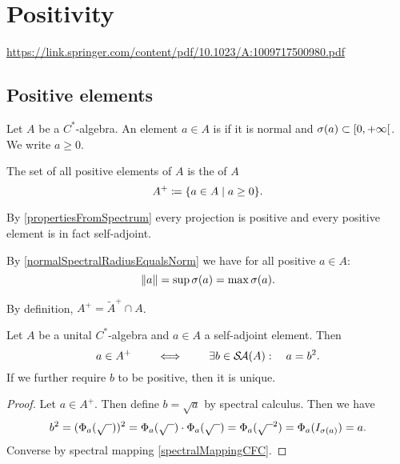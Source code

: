 \section{Positivity}
\url{https://link.springer.com/content/pdf/10.1023/A:1009717500980.pdf}
\subsection{Positive elements}
\begin{definition}
Let $A$ be a $C^*$-algebra. An element $a\in A$ is  if it is normal and $\sigma(a) \subset \interval[co]{0,+\infty}$. We write $a\geq 0$.

The set of all positive elements of $A$ is the  of $A$
\[ A^+ \defeq \setbuilder{a\in A}{a\geq 0}. \]
\end{definition}
By \ref{propertiesFromSpectrum} every projection is positive and every positive element is in fact self-adjoint.

By \ref{normalSpectralRadiusEqualsNorm} we have for all positive $a\in A$:
\[ \lVert a\rVert = \sup\sigma(a) = \max\sigma(a). \]

By definition, $A^+ = \widetilde{A}^+ \cap A$.

\begin{proposition}
Let $A$ be a unital $C^*$-algebra and $a\in A$ a self-adjoint element. Then
\[ a\in A^+ \qquad\iff\qquad \exists b\in \mathop{\mathcal{S}\hspace{-0.15em}\mathcal{A}}\nolimits(A):\quad a = b^2. \]
If we further require $b$ to be positive, then it is unique.
\end{proposition}
\begin{proof}
Let $a\in A^+$. Then define $b = \sqrt{a}$ by spectral calculus. Then we have
\[ b^2 = (\Phi_a(\sqrt{\mbox{\;\;}}))^2 = \Phi_a(\sqrt{\mbox{\;\;}})\cdot \Phi_a(\sqrt{\mbox{\;\;}}) = \Phi_a(\sqrt{\mbox{\;\;}}^2) = \Phi_a(I_{\sigma(a)}) = a. \]
Converse by spectral mapping \ref{spectralMappingCFC}.
\end{proof}

